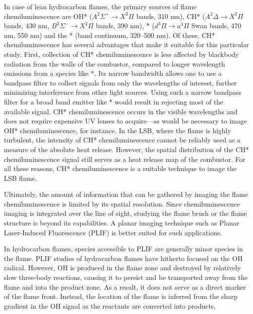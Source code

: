 In case of lean hydrocarbon flames, the primary sources of flame chemiluminescence are OH* (\(A^2\Sigma^+\rightarrow X^2\Pi\) bands, 310 nm), CH* (\(A^2\Delta\rightarrow X^2\Pi\) bands, 430 nm, \(B^2\Sigma^-\rightarrow X^2\Pi\) bands, 390 nm), * (\(d^3\Pi\rightarrow a^3\Pi\) Swan bands, 470 nm, 550 nm) and the * (band continuum, 320--500 nm).
Of these, CH* chemiluminescence has several advantages that make it suitable for this particular study.
First, collection of CH* chemiluminescence is less affected by blackbody radiation from the walls of the combustor, compared to longer wavelength emissions from a species like *.
Its narrow bandwidth allows one to use a bandpass filter to collect signals from only the wavelengths of interest, further minimizing interference from other light sources.
Using such a narrow bandpass filter for a broad band emitter like * would result in rejecting most of the available signal.
CH* chemiluminescence occurs in the visible wavelengths and does not require expensive UV lenses to acquire---as would be necessary to image OH* chemiluminescence, for instance.
In the LSB, where the flame is highly turbulent, the intensity of CH* chemiluminescence cannot be reliably used as a measure of the absolute heat release.\cite{1998-najm}
However, the spatial distribution of the CH* chemiluminescence signal still serves as a heat release map of the combustor.
For all these reasons, CH* chemiluminescence is a suitable technique to image the LSB flame.

Ultimately, the amount of information that can be gathered by imaging the flame chemiluminescence is limited by its spatial resolution.
Since chemiluminescence imaging is integrated over the line of sight, studying the flame brush or the flame structure is beyond its capabilities.
A planar imaging technique such as Planar Laser-Induced Fluorescence (PLIF) is better suited for such applications.

In hydrocarbon flames, species accessible to PLIF are generally minor species in the flame.
PLIF studies of hydrocarbon flames have hitherto focused on the OH radical.
However, OH is produced in the flame zone and destroyed by relatively slow three-body reactions, causing it to persist and be transported away from the flame and into the product zone.\cite{1990-barlow}
As a result, it does not serve as a direct marker of the flame front.
Instead, the location of the flame is inferred from the sharp gradient in the OH signal as the reactants are converted into products.

